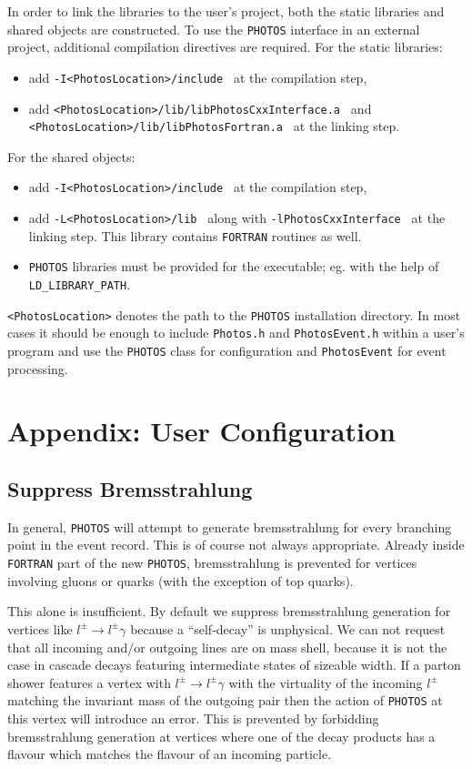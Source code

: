 \documentclass[]{Photos_interface_design}
\begin{document}
In order to link the libraries to the user's project, both the static libraries and shared objects are
constructed. To use the {\tt PHOTOS} interface in an external project, additional 
compilation directives are required. For the static libraries:
\begin{itemize}
  \item add {\tt -I<PhotosLocation>/include } at the compilation step,
  \item add {\tt <PhotosLocation>/lib/libPhotosCxxInterface.a } and\\
        {\tt <PhotosLocation>/lib/libPhotosFortran.a } at the linking step.
\end{itemize}
For the shared objects:
\begin{itemize}
  \item add {\tt -I<PhotosLocation>/include } at the compilation step,
  \item add {\tt -L<PhotosLocation>/lib } along with {\tt -lPhotosCxxInterface } at the linking step.
        This library contains {\tt FORTRAN} routines as well.
  \item  {\tt PHOTOS} libraries must be provided for the executable; eg. with the help of {\tt LD\_LIBRARY\_PATH}.
\end{itemize}
{\tt <PhotosLocation>} denotes the path to the {\tt PHOTOS} installation directory.
In most cases it should be enough to include {\tt Photos.h} and {\tt PhotosEvent.h}
within a user's program and use the {\tt PHOTOS} class for configuration and {\tt PhotosEvent}
for event processing.

\section{Appendix: User Configuration}
\label{sec:User Configuration}

\subsection{Suppress Bremsstrahlung}
\label{section:suppress}

In general, {\tt PHOTOS} will attempt to generate bremsstrahlung for every 
branching point in the event record. This is of course not always appropriate.
Already inside {\tt FORTRAN} part of the new {\tt PHOTOS}, bremsstrahlung is prevented for vertices involving gluons or quarks 
(with the exception of top quarks).

This alone is insufficient. By default we suppress bremsstrahlung
generation for vertices like $l^\pm \to l^\pm \gamma$ because a
``self-decay'' is unphysical. We can not request that all incoming
and/or outgoing lines are on mass shell, because it is not the case in
cascade decays featuring intermediate states of sizeable width. If a
parton shower features a vertex with $l^\pm \to l^\pm \gamma$ with the
virtuality of the incoming $l^\pm$ matching the invariant mass of the
outgoing pair then the action of {\tt PHOTOS} at this vertex will
introduce an error.  This is prevented by forbidding bremsstrahlung
generation at vertices where one of the decay products has a flavour
which matches the flavour of an incoming particle.
\end{document}
